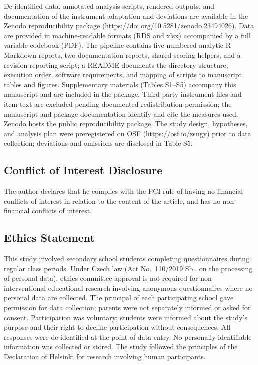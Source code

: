 \documentclass[
  12pt,
]{article}
\begin{document}
De-identified data, annotated analysis scripts, rendered outputs, and
documentation of the instrument adaptation and deviations are available in the
Zenodo reproducibility package
(https://doi.org/10.5281/zenodo.23494026). Data are
provided in machine-readable formats (RDS and xlsx) accompanied by a full
variable codebook (PDF). The pipeline contains five numbered analytic R
Markdown reports, two documentation reports, shared scoring helpers, and a
revision-reporting script; a README documents the directory structure,
execution order, software requirements, and mapping of scripts to manuscript
tables and figures. Supplementary materials (Tables S1--S5) accompany this
manuscript and are included in the package. Third-party instrument files and
item text are excluded pending documented redistribution permission; the
manuscript and package documentation identify and cite the measures used.
Zenodo hosts the public reproducibility package. The study design, hypotheses,
and analysis plan were
preregistered on OSF (https://osf.io/zsngy) prior to data collection;
deviations and omissions are disclosed in Table S5.

\hypertarget{conflict-of-interest-disclosure}{%
\subsection{Conflict of Interest Disclosure}\label{conflict-of-interest-disclosure}}

The author declares that he complies with the PCI rule of having no financial conflicts of interest in relation to the content of the article, and has no non-financial conflicts of interest.

\hypertarget{ethics-statement}{%
\subsection{Ethics Statement}\label{ethics-statement}}

This study involved secondary school students completing questionnaires during regular class periods. Under Czech law (Act No.~110/2019 Sb., on the processing of personal data), ethics committee approval is not required for non-interventional educational research involving anonymous questionnaires where no personal data are collected. The principal of each participating school gave permission for data collection; parents were not separately informed or asked for consent. Participation was voluntary; students were informed about the study's purpose and their right to decline participation without consequences. All responses were de-identified at the point of data entry. No personally identifiable information was collected or stored. The study followed the principles of the Declaration of Helsinki for research involving human participants.
\end{document}

